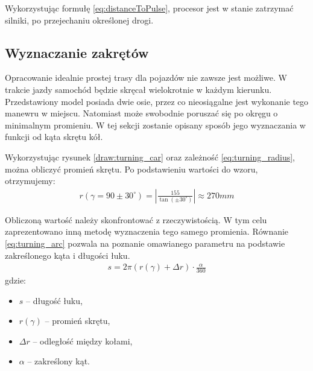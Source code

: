         Wykorzystując formułę \eqref{eq:distanceToPulse}, procesor jest w stanie zatrzymać silniki, po przejechaniu określonej drogi.


    \subsection{Wyznaczanie zakrętów}
    \label{subsubsec:minamalny_promien}
        Opracowanie idealnie prostej trasy dla pojazdów nie zawsze jest możliwe.
        W trakcie jazdy samochód będzie skręcał wielokrotnie w każdym kierunku.
        Przedstawiony model posiada dwie osie, przez co nieosiągalne jest wykonanie tego manewru w miejscu.
        Natomiast może swobodnie poruszać się po okręgu o minimalnym promieniu.
        W tej sekcji zostanie opisany sposób jego wyznaczania w funkcji od kąta skrętu kół.

\newpage
            Wykorzystując rysunek \ref{draw:turning_car} oraz zależność \eqref{eq:turning_radius}, można obliczyć promień skrętu.
            Po podstawieniu wartości do wzoru, otrzymujemy:
            \begin{gather}
                r(\gamma = 90 \pm 30^\circ) = \left|\frac{155}{\tan(\pm 30^\circ)}\right| \approx 270mm
                \label{eq:theoretical_radius}
            \end{gather}

            Obliczoną wartość należy skonfrontować z rzeczywistością.
            W tym celu zaprezentowano inną metodę wyznaczenia tego samego promienia.
            Równanie \eqref{eq:turning_arc} pozwala na poznanie omawianego parametru na podstawie zakreślonego kąta i długości łuku.
            \begin{gather}
                s = 2\pi (r(\gamma) + \Delta r) \cdot \frac{\alpha}{360}
                \label{eq:turning_arc}
            \end{gather}
            gdzie:
            \begin{itemize}
                \item $s$ -- długość łuku,
                \item $r(\gamma)$ -- promień skrętu,
                \item $\Delta r$ -- odległość między kołami,
                \item $\alpha$ -- zakreślony kąt.
            \end{itemize}

